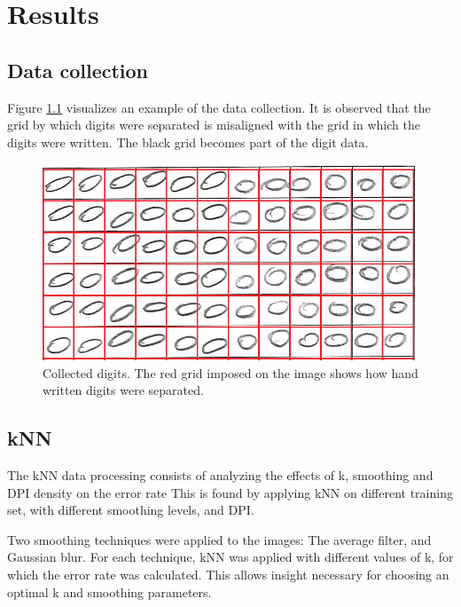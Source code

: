 \chapter{Results}
\section{Data collection}

Figure \ref{fig:misalignment} visualizes an example of the data collection.
It is observed that the grid by which digits were separated is misaligned with the grid
in which the digits were written. The black grid becomes part of the digit data.
\begin{figure}[H]
\centering
\includegraphics[width  =\textwidth]{figure/kiddi-01-grid-nosmooth-300dpi_cut.png}
\caption{Collected digits. The red grid imposed on the image shows how hand written digits were separated.}
\label{fig:misalignment}
\end{figure}

\section{kNN}
The kNN data processing consists of analyzing the effects of k, smoothing and
DPI density on the error rate  This is found by applying kNN on different training set,
with different smoothing levels, and DPI.

Two smoothing techniques were applied to the images: The average filter, and Gaussian blur.  
For each technique, kNN was applied with different values of k, for which the error rate was calculated.
This allows insight necessary for choosing an optimal k and smoothing parameters.

